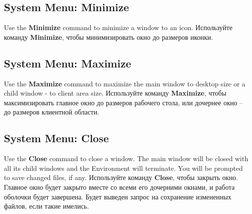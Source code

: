\subsection{System Menu: Minimize}

\ifenglish
Use the {\bf Minimize} command to minimize a window to an icon.
\else
Используйте команду {\bf Minimize}, чтобы минимизировать окно до 
размеров иконки.
\fi
\subsection{System Menu: Maximize}

\ifenglish
Use the {\bf Maximize} command to maximize the main window to desktop size
or a child window - to client area size.
\else
Используйте команду {\bf Maximize}, чтобы максимизировать главное окно до
размеров рабочего стола, или дочернее окно -- до размеров клиентной области.
\fi
\subsection{System Menu: Close}

\ifenglish
Use the {\bf Close} command to close a window. The main window will be 
closed with all its child windows and the Environment will terminate.
You will be prompted to save changed files, if any.
\else
Используйте команду {\bf Close}, чтобы закрыть окно. Главное окно будет 
закрыто вместе со всеми его дочерними окнами, и работа оболочки будет 
завершена. Будет выведен запрос на сохранение измененных файлов, если такие 
имелись.
\fi